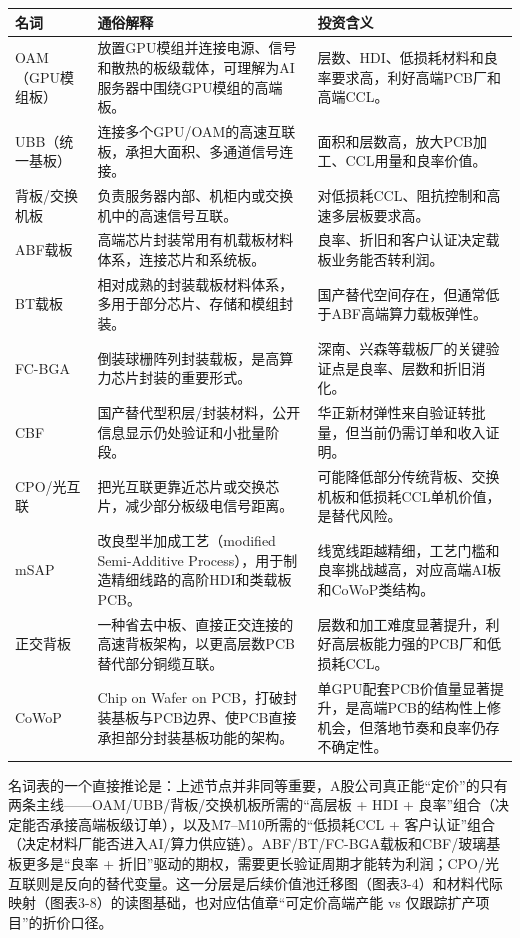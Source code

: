 \begin{exhibitbox}[图表3-2：关键名词解释]
\footnotesize
\begin{tabularx}{\textwidth}{L{2.2cm}X X}
\toprule
\textbf{名词} & \textbf{通俗解释} & \textbf{投资含义} \\
\midrule
OAM（GPU模组板） & 放置GPU模组并连接电源、信号和散热的板级载体，可理解为AI服务器中围绕GPU模组的高端板。 & 层数、HDI、低损耗材料和良率要求高，利好高端PCB厂和高端CCL。 \\
UBB（统一基板） & 连接多个GPU/OAM的高速互联板，承担大面积、多通道信号连接。 & 面积和层数高，放大PCB加工、CCL用量和良率价值。 \\
背板/交换机板 & 负责服务器内部、机柜内或交换机中的高速信号互联。 & 对低损耗CCL、阻抗控制和高速多层板要求高。 \\
ABF载板 & 高端芯片封装常用有机载板材料体系，连接芯片和系统板。 & 良率、折旧和客户认证决定载板业务能否转利润。 \\
BT载板 & 相对成熟的封装载板材料体系，多用于部分芯片、存储和模组封装。 & 国产替代空间存在，但通常低于ABF高端算力载板弹性。 \\
FC-BGA & 倒装球栅阵列封装载板，是高算力芯片封装的重要形式。 & 深南、兴森等载板厂的关键验证点是良率、层数和折旧消化。 \\
CBF & 国产替代型积层/封装材料，公开信息显示仍处验证和小批量阶段。 & 华正新材弹性来自验证转批量，但当前仍需订单和收入证明。 \\
CPO/光互联 & 把光互联更靠近芯片或交换芯片，减少部分板级电信号距离。 & 可能降低部分传统背板、交换机板和低损耗CCL单机价值，是替代风险。 \\
mSAP & 改良型半加成工艺（modified Semi-Additive Process），用于制造精细线路的高阶HDI和类载板PCB。 & 线宽线距越精细，工艺门槛和良率挑战越高，对应高端AI板和CoWoP类结构。 \\
正交背板 & 一种省去中板、直接正交连接的高速背板架构，以更高层数PCB替代部分铜缆互联。 & 层数和加工难度显著提升，利好高层板能力强的PCB厂和低损耗CCL。 \\
CoWoP & Chip on Wafer on PCB，打破封装基板与PCB边界、使PCB直接承担部分封装基板功能的架构。 & 单GPU配套PCB价值量显著提升，是高端PCB的结构性上修机会，但落地节奏和良率仍存不确定性。 \\
\bottomrule
\end{tabularx}
\end{exhibitbox}

名词表的一个直接推论是：上述节点并非同等重要，A股公司真正能``定价''的只有两条主线——OAM/UBB/背板/交换机板所需的``高层板 + HDI + 良率''组合（决定能否承接高端板级订单），以及M7--M10所需的``低损耗CCL + 客户认证''组合（决定材料厂能否进入AI/算力供应链）。ABF/BT/FC-BGA载板和CBF/玻璃基板更多是``良率 + 折旧''驱动的期权，需要更长验证周期才能转为利润；CPO/光互联则是反向的替代变量。这一分层是后续价值池迁移图（图表3-4）和材料代际映射（图表3-8）的读图基础，也对应估值章``可定价高端产能 vs 仅跟踪扩产项目''的折价口径。

